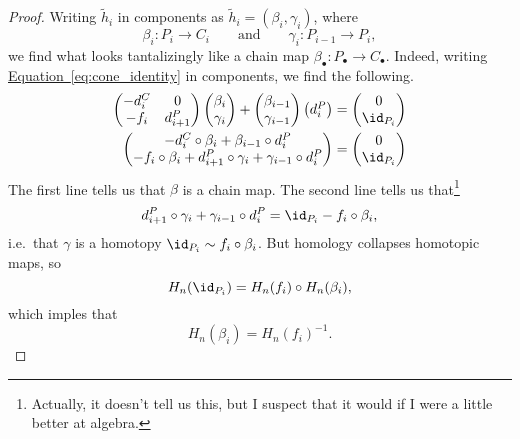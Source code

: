 \documentclass[main.tex]{subfiles}
\begin{document}
\begin{proof}
  Writing $\tilde{h}_{i}$ in components as $\tilde{h}_{i} = (\beta_{i}, \gamma_{i})$, where
  \begin{equation*}
    \beta_{i}\colon P_{i} \to C_{i}\qquad\text{and}\qquad \gamma_{i}\colon P_{i-1} \to P_{i},
  \end{equation*}
  we find what looks tantalizingly like a chain map $\beta_{\bullet}\colon P_{\bullet} \to C_{\bullet}$. Indeed, writing \hyperref[eq:cone_identity]{Equation~\ref*{eq:cone_identity}} in components, we find the following.
  \begin{align*}
    \begin{pmatrix}
      -d^{C}_{i} & 0 \\
      -f_{i} & d^{P}_{i+1}
    \end{pmatrix}
    \begin{pmatrix}
      \beta_{i} \\
      \gamma_{i}
    \end{pmatrix}
    +
    \begin{pmatrix}
      \beta_{i-1} \\
      \gamma_{i-1}
    \end{pmatrix}
    \begin{pmatrix}
      d^{P}_{i}
    \end{pmatrix}
    &=
    \begin{pmatrix}
      0 \\
      \id_{P_{i}}
    \end{pmatrix}
    \\
    \begin{pmatrix}
      -d^{C}_{i} \circ \beta_{i} + \beta_{i-1} \circ d^{P}_{i} \\
      -f_{i} \circ \beta_{i} + d^{P}_{i+1} \circ \gamma_{i} + \gamma_{i-1} \circ d^{P}_{i}
    \end{pmatrix}
    &=
    \begin{pmatrix}
      0 \\
      \id_{P_{i}}
    \end{pmatrix}
  \end{align*}
  The first line tells us that $\beta$ is a chain map. The second line tells us that\footnote{Actually, it doesn't tell us this, but I suspect that it would if I were a little better at algebra.}
  \begin{equation*}
    d^{P}_{i+1} \circ \gamma_{i} + \gamma_{i-1} \circ d^{P}_{i} = \id_{P_{i}} - f_{i} \circ \beta_{i},
  \end{equation*}
  i.e.\ that $\gamma$ is a homotopy $\id_{P_{i}} \sim f_{i} \circ \beta_{i}$. But homology collapses homotopic maps, so
  \begin{equation*}
    H_{n}(\id_{P_{i}}) = H_{n}(f_{i}) \circ H_{n}(\beta_{i}),
  \end{equation*}
  which imples that
  \begin{equation*}
    H_{n}(\beta_{i}) = H_{n}(f_{i})^{-1}.
  \end{equation*}
\end{proof}
\end{document}
